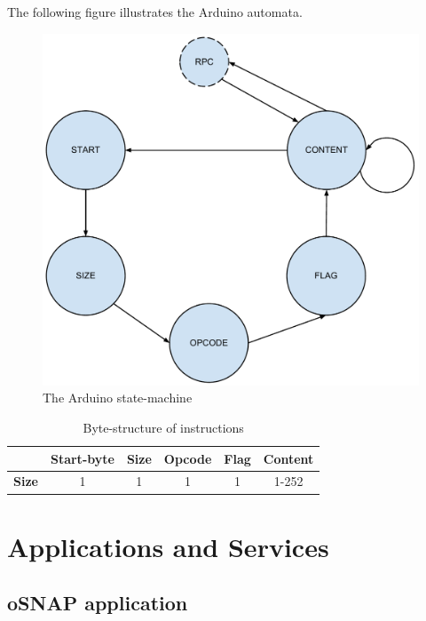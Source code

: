 The following figure illustrates the Arduino automata.

\begin{figure}[h!]
	\centering
	\includegraphics[width=\textwidth, keepaspectratio]{img/arduino_state-machine.pdf}
	\caption{The Arduino state-machine}
	\label{fig:arduino_states}
\end{figure}

\begin{table}
	\begin{tabular}{c|c|c|c|c|c|}
		\cline{2-6}
		& \textbf{Start-byte} & \textbf{Size} & \textbf{Opcode} & \textbf{Flag} & \textbf{Content} \\
		\hline
		\multicolumn{1}{|c|}{\textbf{Size}} & 1 & 1 & 1 & 1 & 1-252 \\
		\hline
	\end{tabular}
	\caption{Byte-structure of instructions}
	\label{tbl:instr_struct}
\end{table}


\section{Applications and Services}

\subsection{oSNAP application}


